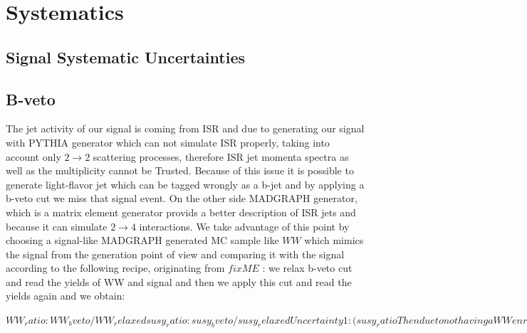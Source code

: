 \section{Systematics}
\label{sect:sys}

\subsection{Signal Systematic Uncertainties}
\subsection{B-veto}
The jet activity of our signal is coming from ISR and due to generating our signal with PYTHIA generator which can not simulate ISR properly, taking into account only $2 \rightarrow 2$ scattering processes, therefore ISR jet momenta spectra as well as the multiplicity cannot be Trusted. Because of this issue it is possible to generate light-flavor jet which can be tagged wrongly as a b-jet and by applying a b-veto cut we miss that signal event. On the other side MADGRAPH generator, which is a matrix element generator provids a better description of ISR jets and because it can simulate $2 \rightarrow 4$ interactions. 
We take advantage of this point by choosing a signal-like MADGRAPH generated MC sample like $WW$ which mimics the signal from the generation point of view and comparing it with the signal according to the following recipe, originating from $fixME$   :
we relax b-veto cut and read the yields of WW and signal and then we apply this cut and read the yields again and we obtain:

$WW_ratio: WW_bveto/ WW_relaxed
susy_ratio: susy_bveto/susy_relaxed
Uncertainty 1: (susy_ratio  Then due to not having a WW enriched region in data we use the previous WW sample multiplied by 0 b-tag SF as data and we re-do the above calculation for data (WW * 0b-tag SF) means applying and relaxing b-tagging and we have:
data_ratio: data_bveto/ WW_relaxed
Uncertainty 2: (data_ratio and finally we obtain:
B-tagged jet vet systematic: (Uncertainty1*Uncertainty1 + Uncertainty2*Uncertainty2)^1/2  $

